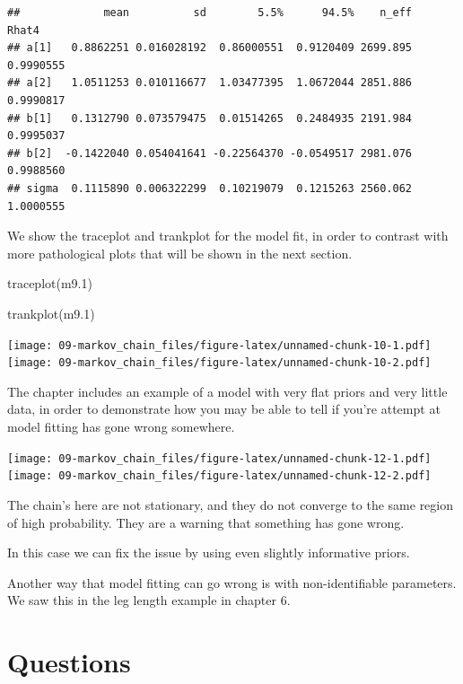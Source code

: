 \documentclass[
]{book}
\newenvironment{Shaded}{\begin{snugshade}}{\end{snugshade}}
\newcommand{\FloatTok}[1]{\textcolor[rgb]{0.00,0.00,0.81}{#1}}
\newcommand{\FunctionTok}[1]{\textcolor[rgb]{0.00,0.00,0.00}{#1}}
\newcommand{\NormalTok}[1]{#1}
\begin{document}
\begin{verbatim}
##             mean          sd        5.5%      94.5%    n_eff     Rhat4
## a[1]   0.8862251 0.016028192  0.86000551  0.9120409 2699.895 0.9990555
## a[2]   1.0511253 0.010116677  1.03477395  1.0672044 2851.886 0.9990817
## b[1]   0.1312790 0.073579475  0.01514265  0.2484935 2191.984 0.9995037
## b[2]  -0.1422040 0.054041641 -0.22564370 -0.0549517 2981.076 0.9988560
## sigma  0.1115890 0.006322299  0.10219079  0.1215263 2560.062 1.0000555
\end{verbatim}

We show the traceplot and trankplot for the model fit, in order to contrast with more pathological plots that will be shown in the next section.

\begin{Shaded}
\begin{Highlighting}[]
\FunctionTok{traceplot}\NormalTok{(m9}\FloatTok{.1}\NormalTok{)}

\FunctionTok{trankplot}\NormalTok{(m9}\FloatTok{.1}\NormalTok{)}
\end{Highlighting}
\end{Shaded}

\texttt{[image: 09-markov\_chain\_files/figure-latex/unnamed-chunk-10-1.pdf]} \texttt{[image: 09-markov\_chain\_files/figure-latex/unnamed-chunk-10-2.pdf]}

The chapter includes an example of a model with very flat priors and very little data, in order to demonstrate how you may be able to tell if you're attempt at model fitting has gone wrong somewhere.

\texttt{[image: 09-markov\_chain\_files/figure-latex/unnamed-chunk-12-1.pdf]} \texttt{[image: 09-markov\_chain\_files/figure-latex/unnamed-chunk-12-2.pdf]}

The chain's here are not stationary, and they do not converge to the same region of high probability. They are a warning that something has gone wrong.

In this case we can fix the issue by using even slightly informative priors.

Another way that model fitting can go wrong is with non-identifiable parameters. We saw this in the leg length example in chapter 6.

\hypertarget{questions-8}{%
\section{Questions}\label{questions-8}}
\end{document}

